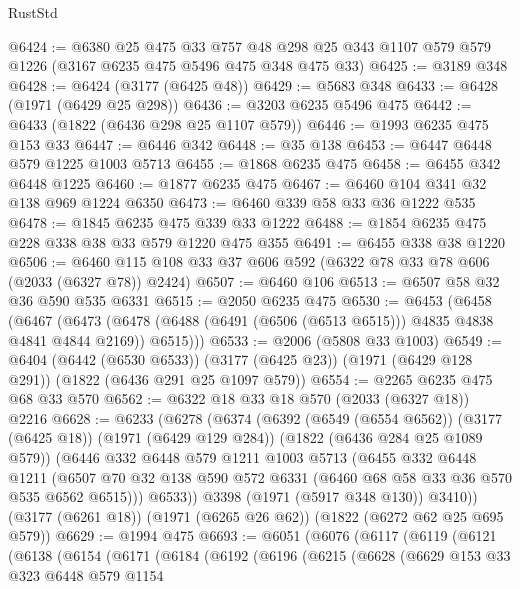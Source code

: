 \begin{lexlean}{RustStd}
\begin{coremodule}
{\begin{coremodule}
{{{{{{{{{{{{{@6424 := @6380
    @25
    @475
    @33
    @757
    @48
    @298
    @25
    @343
    @1107
    @579
    @579
    @1226
    (@3167 @6235 @475 @5496 @475 @348 @475 @33)
@6425 := @3189 @348
@6428 := @6424 (@3177 (@6425 @48))
@6429 := @5683 @348
@6433 := @6428 (@1971 (@6429 @25 @298))
@6436 := @3203 @6235 @5496 @475
@6442 := @6433 (@1822 (@6436 @298 @25 @1107 @579))
@6446 := @1993 @6235 @475 @153 @33
@6447 := @6446 @342
@6448 := @35 @138
@6453 := @6447 @6448 @579 @1225 @1003 @5713
@6455 := @1868 @6235 @475
@6458 := @6455 @342 @6448 @1225
@6460 := @1877 @6235 @475
@6467 := @6460 @104 @341 @32 @138 @969 @1224 @6350
@6473 := @6460 @339 @58 @33 @36 @1222 @535
@6478 := @1845 @6235 @475 @339 @33 @1222
@6488 := @1854 @6235 @475 @228 @338 @38 @33 @579 @1220 @475 @355
@6491 := @6455 @338 @38 @1220
@6506 := @6460 @115 @108 @33 @37 @606 @592 (@6322 @78 @33 @78 @606 (@2033 (@6327 @78)) @2424)
@6507 := @6460 @106
@6513 := @6507 @58 @32 @36 @590 @535 @6331
@6515 := @2050 @6235 @475
@6530 := @6453
    (@6458
      (@6467
        (@6473 (@6478 (@6488 (@6491 (@6506 (@6513 @6515))) @4835 @4838 @4841 @4844 @2169)) @6515)))
@6533 := @2006 (@5808 @33 @1003)
@6549 := @6404
    (@6442 (@6530 @6533))
    (@3177 (@6425 @23))
    (@1971 (@6429 @128 @291))
    (@1822 (@6436 @291 @25 @1097 @579))
@6554 := @2265 @6235 @475 @68 @33 @570
@6562 := @6322 @18 @33 @18 @570 (@2033 (@6327 @18)) @2216
@6628 := @6233
    (@6278
      (@6374
        (@6392
          (@6549 (@6554 @6562))
          (@3177 (@6425 @18))
          (@1971 (@6429 @129 @284))
          (@1822 (@6436 @284 @25 @1089 @579))
          (@6446
            @332
            @6448
            @579
            @1211
            @1003
            @5713
            (@6455
              @332
              @6448
              @1211
              (@6507 @70 @32 @138 @590 @572 @6331 (@6460 @68 @58 @33 @36 @570 @535 @6562 @6515)))
            @6533))
        @3398
        (@1971 (@5917 @348 @130))
        @3410))
    (@3177 (@6261 @18))
    (@1971 (@6265 @26 @62))
    (@1822 (@6272 @62 @25 @695 @579))
@6629 := @1994 @475
@6693 := @6051
    (@6076
      (@6117
        (@6119
          (@6121
            (@6138
              (@6154
                (@6171
                  (@6184
                    (@6192
                      (@6196
                        (@6215
                          (@6628
                            (@6629
                              @153
                              @33
                              @323
                              @6448
                              @579
                              @1154
}}}}}}}}}}}}}
\end{coremodule}}
\end{coremodule}
\end{lexlean}
